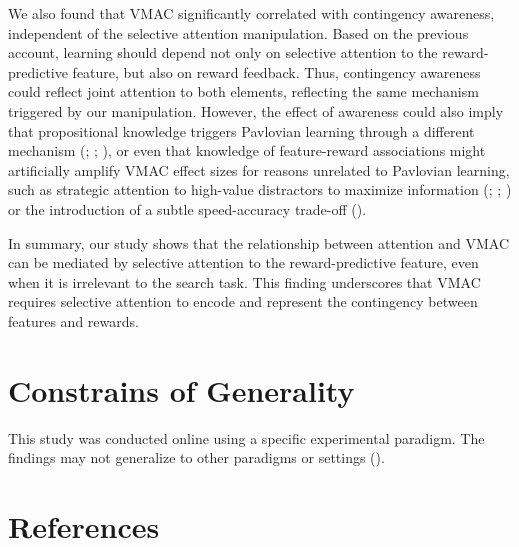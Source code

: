 \documentclass[
  man,
  floatsintext,
  longtable,
  nolmodern,
  notxfonts,
  notimes,
  colorlinks=true,linkcolor=blue,citecolor=blue,urlcolor=blue]{apa7}
\begin{document}
We also found that VMAC significantly correlated with contingency
awareness, independent of the selective attention manipulation. Based on
the previous account, learning should depend not only on selective
attention to the reward-predictive feature, but also on reward feedback.
Thus, contingency awareness could reflect joint attention to both
elements, reflecting the same mechanism triggered by our manipulation.
However, the effect of awareness could also imply that propositional
knowledge triggers Pavlovian learning through a different mechanism
(;
;
), or even that knowledge of
feature-reward associations might artificially amplify VMAC effect sizes
for reasons unrelated to Pavlovian learning, such as strategic attention
to high-value distractors to maximize information
(;
;
) or the introduction of a
subtle speed-accuracy trade-off
().

In summary, our study shows that the relationship between attention and
VMAC can be mediated by selective attention to the reward-predictive
feature, even when it is irrelevant to the search task. This finding
underscores that VMAC requires selective attention to encode and
represent the contingency between features and rewards.

\section{Constrains of Generality}\label{constrains-of-generality}

This study was conducted online using a specific experimental paradigm.
The findings may not generalize to other paradigms or settings
().

\section{References}\label{references}
\end{document}
